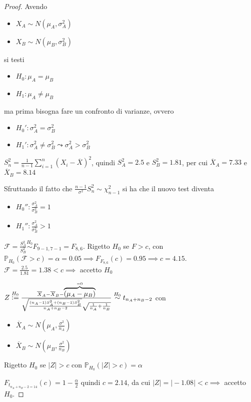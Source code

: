 \documentclass[hidelinks, 10pt]{report}
\begin{document}
\begin{proof}
Avendo
\begin{itemize}
\item $ X_{A} \sim N (\mu_{A}, \sigma^{2}_{A}) $
\item $ X_{B} \sim N (\mu_{B}, \sigma^{2}_{B}) $
\end{itemize}

si testi
\begin{itemize}
\item $ H_{0}: \mu_{A} = \mu_{B} $
\item $ H_{1}: \mu_{A} \ne \mu_{B} $
\end{itemize}

ma prima bisogna fare un confronto di varianze, ovvero
\begin{itemize}
\item $ H_{0}': \sigma^{2}_{A} = \sigma^{2}_{B} $
\item $ H_{1}': \sigma^{2}_{A} \ne \sigma^{2}_{B} \leadsto \sigma^{2}_{A} > \sigma^{2}_{B} $
\end{itemize}

$ S_{n}^{2} = \frac{1}{n - 1} \sum\limits_{i = 1}^{n} (X_{i} - \overline{X})^{2} $, quindi $ S^{2}_{A} = 2.5 $ e $ S^{2}_{B} = 1.81 $, per cui $ \overline{X}_{A} = 7.33 $ e $ \overline{X}_{B} = 8.14 $

Sfruttando il fatto che $ \frac{n - 1}{\sigma^{2}} S^{2}_{n} \sim \chi^{2}_{n - 1} $ si ha che il nuovo test diventa
\begin{itemize}
\item $ H_{0}'': \frac{\sigma^{2}_{A}}{\sigma^{2}_{B}} = 1 $
\item $ H_{1}'': \frac{\sigma^{2}_{A}}{\sigma^{2}_{B}} > 1 $
\end{itemize}

$ \mathcal{F} = \frac{S_{A}^{2}}{S_{B}^{2}} \stackrel{H_{0}}{\sim} F_{9 - 1, 7 - 1} = F_{8, 6} $. Rigetto $ H_{0} $ se $ F > c $, con $ \mathbb{P}_{H_{0}} (\mathcal{F} > c) = \alpha = 0.05 \implies F_{F_{8,6}} (c) = 0.95 \implies c = 4.15 $. $ \mathcal{F} = \frac{2.5}{1.81} = 1.38 < c \implies $ accetto $ H_{0} $

$ Z \stackrel{H_{0}}{\vcentcolon=} \frac{\overline{X}_{A} - \overline{X}_{B} - \overbrace{(\mu_{A} - \mu_{B})}^{= 0}}{\sqrt{\frac{(n_{A} - 1)S^{2}_{A} + (n_{B} - 1) S^{2}_{B}}{n_{A} + n_{B} - 2}} \sqrt{\frac{1}{n_{A}} + \frac{1}{n_{B}}}} \stackrel{H_{0}}{\sim} t_{n_{A} + n_{B} - 2} $ con 
\begin{itemize}
\item $ \overline{X}_{A} \sim N \left(\mu_{A}, \frac{\sigma^{2}}{n_{A}} \right) $
\item $ \overline{X}_{B} \sim N \left(\mu_{B}, \frac{\sigma^{2}}{n_{B}} \right) $
\end{itemize}

Rigetto $ H_{0} $ se $ \vert Z \vert > c $ con $ \mathbb{P}_{H_{0}} (\vert Z \vert > c) = \alpha $


$ F_{t_{n_{A} + n_{B} - 2 = 14}} (c) = 1 - \frac{\alpha}{2} $ quindi $ c = 2.14 $, da cui $ \vert Z \vert = \vert - 1.08 \vert < c \implies $ accetto $ H_{0} $.  
\end{proof}
\end{document}
